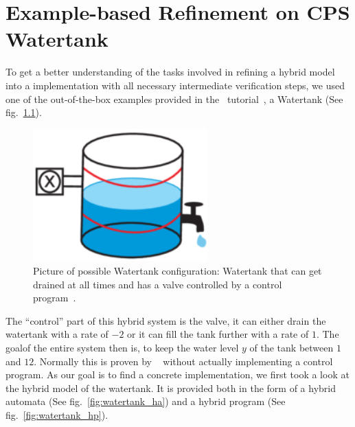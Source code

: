 


\chapter{Example-based Refinement on CPS Watertank}
\label{ch:Watertank}

To get a better understanding of the tasks involved in refining a hybrid model into a implementation with all necessary intermediate verification steps, we used one of the out-of-the-box examples provided in the \keym~tutorial~\cite{keYmaera}, a Watertank (See fig.~\ref{fig:watertank}).

\begin{figure}
	\setcounter{figure}{0}
	\centering
	\includegraphics[width=0.6\textwidth]{images/watertank}
	\caption{Picture of possible Watertank configuration: Watertank that can get drained at all times and has a valve controlled by a control program~\cite{keymaeraGuide}.}
	\label{fig:watertank}
\end{figure}

The ``control'' part of this hybrid system is the valve, it can either drain the watertank with a rate of \(-2\) or it can fill the tank further with a rate of \(1\). The goalof the entire system then is, to keep the water level \(y\) of the tank between \(1\) and \(12\). Normally this is proven by \keym~ without actually implementing a control program. As our goal is to find a concrete implementation,  we first took a look at the hybrid model of the watertank. It is provided both in the form of a hybrid automata (See fig.~\ref{fig:watertank_ha}) and a hybrid program (See fig.~\ref{fig:watertank_hp}).


